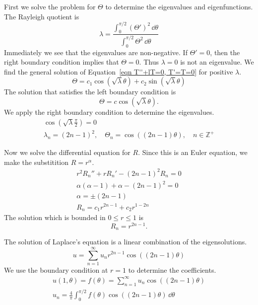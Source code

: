 {\begin{Solution}
\begin{enumerate}
    First we solve the problem for $\Theta$ to determine the eigenvalues and
    eigenfunctions.  The Rayleigh quotient is
    \[
    \lambda = \frac{ \int_0^{\pi/2} \left( \Theta' \right)^2 \,\dd \theta }{ \int_0^{\pi/2} \Theta^2 \,\dd \theta }
    \]
    Immediately we see that the eigenvalues are non-negative.  If $\Theta' = 0$, 
    then the right boundary condition implies that $\Theta = 0$.  Thus $\lambda = 0$ is 
    not an eigenvalue.  We find the general solution of 
    Equation~\ref{eqn T''+lT=0, T'=T=0} for positive $\lambda$.
    \[
    \Theta = c_1 \cos \left( \sqrt{\lambda} \theta \right) + c_2 \sin \left( \sqrt{\lambda} \theta \right)
    \]
    The solution that satisfies the left boundary condition is
    \[
    \Theta = c \cos \left( \sqrt{\lambda} \theta \right).
    \]
    We apply the right boundary condition to determine the eigenvalues.
    \begin{gather*}
      \cos \left( \sqrt{\lambda} \frac{\pi}{2} \right) = 0
      \\
      \lambda_n = (2 n - 1)^2, \quad \Theta_n = \cos \left( (2 n - 1) \theta \right), 
      \quad n \in \mathbb{Z}^+
    \end{gather*}

    Now we solve the differential equation for $R$.  Since this is an Euler
    equation, we make the substitition $R = r^\alpha$.
    \begin{gather*}
      r^2 R_n'' + r R_n' - (2 n - 1)^2 R_n = 0
      \\
      \alpha (\alpha - 1) + \alpha - (2 n - 1)^2 = 0
      \\
      \alpha = \pm (2 n - 1)
      \\
      R_n = c_1 r^{2 n - 1} + c_2 r^{1 - 2 n}
    \end{gather*}
    The solution which is bounded in $0 \leq r \leq 1$ is
    \[
    R_n = r^{2 n - 1}.
    \]

    The solution of Laplace's equation is a linear combination of the 
    eigensolutions.
    \[
    u = \sum_{n = 1}^\infty u_n r^{2 n - 1} \cos \left( (2 n - 1) \theta \right)
    \]
    We use the boundary condition at $r = 1$ to determine the coefficients.
    \begin{gather*}
      u(1,\theta) = f(\theta) = \sum_{n = 1}^\infty u_n \cos \left( (2 n - 1) \theta \right)
      \\
      u_n = \frac{4}{\pi} \int_0^{\pi/2} f(\theta) \cos \left( (2 n - 1) \theta \right) \,\dd \theta
    \end{gather*}


\end{enumerate}
\end{Solution}}
